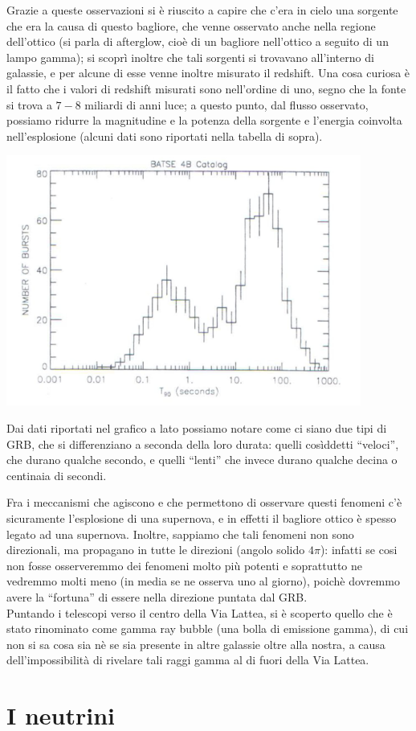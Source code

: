 Grazie a queste osservazioni si è riuscito a capire che c'era in cielo una sorgente che era la causa di questo bagliore, che venne osservato anche nella regione dell'ottico (si parla di afterglow, cioè di un bagliore nell'ottico a seguito di un lampo gamma); si scoprì inoltre che tali sorgenti si trovavano all'interno di galassie, e per alcune di esse venne inoltre misurato il redshift. Una cosa curiosa è il fatto che i valori di redshift misurati sono nell'ordine di  uno, segno che la fonte si trova a $7-8$ miliardi di anni luce; a questo punto, dal flusso osservato, possiamo ridurre la magnitudine e la potenza della sorgente e l'energia coinvolta nell'esplosione (alcuni dati sono riportati nella tabella di sopra).
\\
\begin{minipage}{.45\textwidth}
	\centering
	\includegraphics[width=0.875\textwidth]{Img/bertin_14bis.png}
\end{minipage}
\begin{minipage}{.55\textwidth}
Dai dati riportati nel grafico a lato possiamo notare come ci siano due tipi di GRB, che si differenziano a seconda della loro durata: quelli cosìddetti ``veloci'', che durano qualche secondo, e quelli ``lenti'' che invece durano qualche decina o centinaia di secondi.
\end{minipage}

Fra i meccanismi che agiscono e che permettono di osservare questi fenomeni c'è sicuramente l'esplosione di una supernova, e in effetti il bagliore ottico è spesso legato ad una supernova. Inoltre, sappiamo che tali fenomeni non sono direzionali, ma propagano in tutte le direzioni (angolo solido $4 \pi$): infatti se cosi non fosse osserveremmo dei fenomeni molto più potenti e soprattutto ne vedremmo molti meno (in media se ne osserva uno al giorno), poichè dovremmo avere la ``fortuna'' di essere nella direzione puntata dal GRB.
\\
Puntando i telescopi verso il centro della Via Lattea, si è scoperto quello che è stato rinominato come gamma ray bubble (una bolla di emissione gamma), di cui non si sa cosa sia nè se sia presente in altre galassie oltre alla nostra, a causa dell'impossibilità di rivelare tali raggi gamma al di fuori della Via Lattea.
\\

\section{I neutrini}

